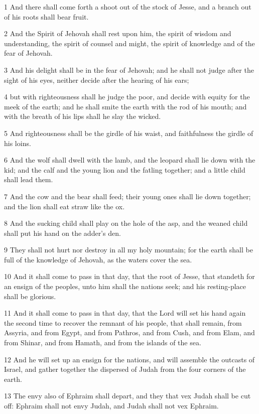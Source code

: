 \par 1 And there shall come forth a shoot out of the stock of Jesse, and a branch out of his roots shall bear fruit.
\par 2 And the Spirit of Jehovah shall rest upon him, the spirit of wisdom and understanding, the spirit of counsel and might, the spirit of knowledge and of the fear of Jehovah.
\par 3 And his delight shall be in the fear of Jehovah; and he shall not judge after the sight of his eyes, neither decide after the hearing of his ears;
\par 4 but with righteousness shall he judge the poor, and decide with equity for the meek of the earth; and he shall smite the earth with the rod of his mouth; and with the breath of his lips shall he slay the wicked.
\par 5 And righteousness shall be the girdle of his waist, and faithfulness the girdle of his loins.
\par 6 And the wolf shall dwell with the lamb, and the leopard shall lie down with the kid; and the calf and the young lion and the fatling together; and a little child shall lead them.
\par 7 And the cow and the bear shall feed; their young ones shall lie down together; and the lion shall eat straw like the ox.
\par 8 And the sucking child shall play on the hole of the asp, and the weaned child shall put his hand on the adder's den.
\par 9 They shall not hurt nor destroy in all my holy mountain; for the earth shall be full of the knowledge of Jehovah, as the waters cover the sea.
\par 10 And it shall come to pass in that day, that the root of Jesse, that standeth for an ensign of the peoples, unto him shall the nations seek; and his resting-place shall be glorious.
\par 11 And it shall come to pass in that day, that the Lord will set his hand again the second time to recover the remnant of his people, that shall remain, from Assyria, and from Egypt, and from Pathros, and from Cush, and from Elam, and from Shinar, and from Hamath, and from the islands of the sea.
\par 12 And he will set up an ensign for the nations, and will assemble the outcasts of Israel, and gather together the dispersed of Judah from the four corners of the earth.
\par 13 The envy also of Ephraim shall depart, and they that vex Judah shall be cut off: Ephraim shall not envy Judah, and Judah shall not vex Ephraim.
